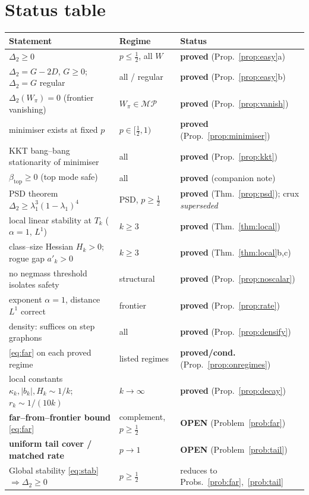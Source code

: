 \documentclass[11pt]{article}
\theoremstyle{definition}
\newcommand{\MP}{\mathcal{MP}}
\newcommand{\Tk}{T_k}
\begin{document}
\section{Status table}\label{sec:status}

\begin{center}
\small
\begin{tabular}{lll}
\toprule
Statement & Regime & Status\\
\midrule
$\Delta_2\ge0$ & $p\le\tfrac12$, all $W$ & \textbf{proved} (Prop.~\ref{prop:easy}a)\\
$\Delta_2=G-2D$, $G\ge0$; $\Delta_2=G$ regular & all / regular & \textbf{proved} (Prop.~\ref{prop:easy}b)\\
$\Delta_2(W_\pi)=0$ (frontier vanishing) & $W_\pi\in\MP$ & \textbf{proved} (Prop.~\ref{prop:vanish})\\
minimiser exists at fixed $p$ & $p\in[\tfrac12,1)$ & \textbf{proved} (Prop.~\ref{prop:minimiser})\\
KKT bang--bang stationarity of minimiser & all & \textbf{proved} (Prop.~\ref{prop:kkt})\\
$\beta_{\mathrm{top}}\ge0$ (top mode safe) & all & \textbf{proved} (companion note)\\
PSD theorem $\Delta_2\ge\lambda_1^3(1-\lambda_1)^4$ & PSD, $p\ge\tfrac12$ & \textbf{proved} (Thm.~\ref{prop:psd}); crux \emph{superseded}\\
local linear stability at $\Tk$ ($\alpha=1$, $L^1$) & $k\ge3$ & \textbf{proved} (Thm.~\ref{thm:local})\\
class--size Hessian $H_k>0$; rogue gap $a'_k>0$ & $k\ge3$ & \textbf{proved} (Thm.~\ref{thm:local}b,c)\\
no negmass threshold isolates safety & structural & \textbf{proved} (Prop.~\ref{prop:noscalar})\\
exponent $\alpha=1$, distance $L^1$ correct & frontier & \textbf{proved} (Prop.~\ref{prop:rate})\\
density: suffices on step graphons & all & \textbf{proved} (Prop.~\ref{prop:densify})\\
\eqref{eq:far} on each proved regime & listed regimes & \textbf{proved/cond.} (Prop.~\ref{prop:onregimes})\\
local constants $\kappa_k,|b_k|,H_k\sim1/k$; $r_k\sim1/(10k)$ & $k\to\infty$ & \textbf{proved} (Prop.~\ref{prop:decay})\\
\midrule
\textbf{far--from--frontier bound} \eqref{eq:far} & complement, $p\ge\tfrac12$ & \textbf{OPEN} (Problem~\ref{prob:far})\\
\textbf{uniform tail cover / matched rate} & $p\to1$ & \textbf{OPEN} (Problem~\ref{prob:tail})\\
Global stability \eqref{eq:stab} $\Rightarrow\Delta_2\ge0$ & $p\ge\tfrac12$ & reduces to Probs.~\ref{prob:far},~\ref{prob:tail}\\
\bottomrule
\end{tabular}
\end{center}
\end{document}
